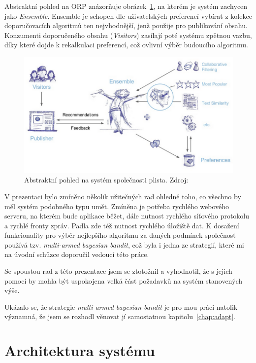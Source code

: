 \documentclass[thesis=M,czech]{FITthesis}[2014/05/07]
\begin{document}
Abstraktní pohled na ORP znázorňuje obrázek~\ref{fig:plista}, na kterém je systém zachycen jako \emph{Ensemble}. Ensemble je schopen dle uživatelských preferencí vybírat z kolekce doporučovacích algoritmů ten nejvhodnější, jenž použije pro publikování obsahu. Konzumenti doporučeného obsahu (\emph{Visitors}) zasílají poté systému zpětnou vazbu, díky které dojde k rekalkulaci preferencí, což ovlivní výběr budoucího algoritmu.

\begin{figure}\centering
	\includegraphics[width=1.0\textwidth]{obr/plistaEnsemble.png}
 	\caption[Abstraktní pohled na systém společnosti plista]{Abstraktní pohled na systém společnosti plista. Zdroj: \cite{slideshare:plista}}\label{fig:plista}
\end{figure}	

V prezentaci bylo zmíněno několik užitečných rad ohledně toho, co všechno by měl systém podobného typu umět. Zmíněna je potřeba rychlého webového serveru, na kterém bude aplikace běžet, dále nutnost rychlého síťového protokolu a rychlé fronty zpráv. Padla zde též nutnost rychlého úložiště dat. K dosažení funkcionality pro výběr nejlepšího algoritmu za daných podmínek společnost používá tzv. \emph{multi-armed bayesian bandit}, což byla i jedna ze strategií, které mi na úvodní schůzce doporučil vedoucí této práce.

Se spoustou rad z této prezentace jsem se ztotožnil a vyhodnotil, že s jejich pomocí by mohla být uspokojena velká část požadavků na systém stanovených výše.

Ukázalo se, že strategie \emph{multi-armed bayesian bandit} je pro mou práci natolik významná, že jsem se rozhodl věnovat jí samostatnou kapitolu~\ref{chap:adapt}.

\section{Architektura systému}
\end{document}
